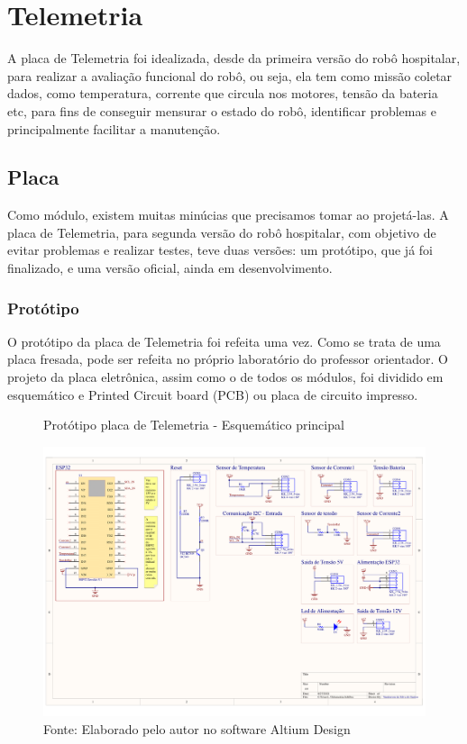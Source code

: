 \documentclass[../delivery_hospital_report.tex]{subfiles}
\begin{document}
\clearpage

\section{Telemetria}

A placa de Telemetria foi idealizada, desde da primeira versão do robô hospitalar, para realizar a avaliação funcional do robô, ou seja, ela tem como missão coletar dados, como temperatura, corrente que circula nos motores, tensão da bateria etc, para fins de conseguir mensurar o estado do robô, identificar problemas e principalmente facilitar a manutenção.

\subsection{Placa}

Como módulo, existem muitas minúcias que precisamos tomar ao projetá-las. A placa de Telemetria, para segunda versão do robô hospitalar, com objetivo de evitar problemas e realizar testes, teve duas versões: um protótipo, que já foi finalizado, e uma versão oficial, ainda em desenvolvimento. 

\subsubsection{Protótipo}

O protótipo da placa de Telemetria foi refeita uma vez. Como se trata de uma placa fresada, pode ser refeita no próprio laboratório do professor orientador. O projeto da placa eletrônica, assim como o de todos os módulos, foi dividido em esquemático e Printed Circuit board (PCB)  ou placa de circuito impresso. 

\begin{figure}[!h]
\centering
    \caption{Protótipo placa de Telemetria - Esquemático principal }
    \centering %
    \includegraphics[width=17cm]{modulos/Telemetria-1.png}
    \caption*{Fonte: Elaborado pelo autor no software Altium Design\cite{altium21} }
    \label{Protótipo placa de ## - Esquemático principal}
\end{figure}
\end{document}
